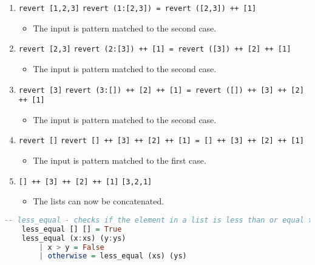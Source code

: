 \documentclass{article}
\theoremstyle{theorem}
\theoremstyle{definition}
\theoremstyle{remark}
\begin{document}
\begin{enumerate}[noitemsep]
    \item \texttt{revert [1,2,3]}
    \linebreak \texttt{revert (1:[2,3]) = revert ([2,3]) ++ [1]}
    \begin{itemize}
        \item The input is pattern matched to the second case.
    \end{itemize} 
    \item \texttt{revert [2,3]}
    \linebreak \texttt{revert (2:[3]) ++ [1] = revert ([3]) ++ [2] ++ [1]}
    \begin{itemize}
        \item The input is pattern matched to the second case.
    \end{itemize}
    \item \texttt{revert [3]}
    \linebreak \texttt{revert (3:[]) ++ [2] ++ [1] = revert ([]) ++ [3] ++ [2] ++ [1]}
    \begin{itemize}
        \item The input is pattern matched to the second case.
    \end{itemize}
    \item \texttt{revert []}
    \linebreak \texttt{revert [] ++ [3] ++ [2] ++ [1] = [] ++ [3] ++ [2] ++ [1]}
    \begin{itemize}
        \item The input is pattern matched to the first case.
    \end{itemize}
    \item \texttt{[] ++ [3] ++ [2] ++ [1]}
    \linebreak \texttt{[3,2,1]}
    \begin{itemize}
        \item The lists can now be concatenated.
    \end{itemize}
\end{enumerate}

\begin{lstlisting}[language=Haskell]
    -- less_equal - checks if the element in a list is less than or equal to the same-indexed element in another list
    less_equal [] [] = True
    less_equal (x:xs) (y:ys)
        | x > y = False
        | otherwise = less_equal (xs) (ys)
\end{lstlisting}
    
\end{document}
